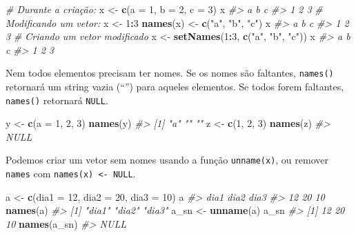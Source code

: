 \documentclass[]{book}
\newenvironment{Shaded}{\begin{snugshade}}{\end{snugshade}}
\newcommand{\KeywordTok}[1]{\textcolor[rgb]{0.13,0.29,0.53}{\textbf{#1}}}
\newcommand{\DataTypeTok}[1]{\textcolor[rgb]{0.13,0.29,0.53}{#1}}
\newcommand{\DecValTok}[1]{\textcolor[rgb]{0.00,0.00,0.81}{#1}}
\newcommand{\StringTok}[1]{\textcolor[rgb]{0.31,0.60,0.02}{#1}}
\newcommand{\CommentTok}[1]{\textcolor[rgb]{0.56,0.35,0.01}{\textit{#1}}}
\newcommand{\OperatorTok}[1]{\textcolor[rgb]{0.81,0.36,0.00}{\textbf{#1}}}
\newcommand{\NormalTok}[1]{#1}
\begin{document}
\begin{Shaded}
\begin{Highlighting}[]
\CommentTok{# Durante a criação:}
\NormalTok{x <-}\StringTok{ }\KeywordTok{c}\NormalTok{(}\DataTypeTok{a =} \DecValTok{1}\NormalTok{, }\DataTypeTok{b =} \DecValTok{2}\NormalTok{, }\DataTypeTok{c =} \DecValTok{3}\NormalTok{)}
\NormalTok{x}
\CommentTok{#> a b c }
\CommentTok{#> 1 2 3}
\CommentTok{# Modificando um vetor:}
\NormalTok{x <-}\StringTok{ }\DecValTok{1}\OperatorTok{:}\DecValTok{3}
\KeywordTok{names}\NormalTok{(x) <-}\StringTok{ }\KeywordTok{c}\NormalTok{(}\StringTok{"a"}\NormalTok{, }\StringTok{"b"}\NormalTok{, }\StringTok{"c"}\NormalTok{)}
\NormalTok{x}
\CommentTok{#> a b c }
\CommentTok{#> 1 2 3}
\CommentTok{# Criando um vetor modificado}
\NormalTok{x <-}\StringTok{ }\KeywordTok{setNames}\NormalTok{(}\DecValTok{1}\OperatorTok{:}\DecValTok{3}\NormalTok{, }\KeywordTok{c}\NormalTok{(}\StringTok{"a"}\NormalTok{, }\StringTok{"b"}\NormalTok{, }\StringTok{"c"}\NormalTok{))}
\NormalTok{x}
\CommentTok{#> a b c }
\CommentTok{#> 1 2 3}
\end{Highlighting}
\end{Shaded}

Nem todos elementos precisam ter nomes. Se os nomes são faltantes,
\texttt{names()} retornará um string vazia (``'') para aqueles
elementos. Se todos forem faltantes, \texttt{names()} retornará
\texttt{NULL}.

\begin{Shaded}
\begin{Highlighting}[]
\NormalTok{y <-}\StringTok{ }\KeywordTok{c}\NormalTok{(}\DataTypeTok{a =} \DecValTok{1}\NormalTok{, }\DecValTok{2}\NormalTok{, }\DecValTok{3}\NormalTok{)}
\KeywordTok{names}\NormalTok{(y)}
\CommentTok{#> [1] "a" ""  ""}
\NormalTok{z <-}\StringTok{ }\KeywordTok{c}\NormalTok{(}\DecValTok{1}\NormalTok{, }\DecValTok{2}\NormalTok{, }\DecValTok{3}\NormalTok{)}
\KeywordTok{names}\NormalTok{(z)}
\CommentTok{#> NULL}
\end{Highlighting}
\end{Shaded}

Podemos criar um vetor sem nomes usando a função \texttt{unname(x)}, ou
remover \texttt{names} com \texttt{names(x)\ \textless{}-\ NULL}.

\begin{Shaded}
\begin{Highlighting}[]
\NormalTok{a <-}\StringTok{ }\KeywordTok{c}\NormalTok{(}\DataTypeTok{dia1 =} \DecValTok{12}\NormalTok{, }\DataTypeTok{dia2 =} \DecValTok{20}\NormalTok{, }\DataTypeTok{dia3 =} \DecValTok{10}\NormalTok{)}
\NormalTok{a}
\CommentTok{#> dia1 dia2 dia3 }
\CommentTok{#>   12   20   10}
\KeywordTok{names}\NormalTok{(a)}
\CommentTok{#> [1] "dia1" "dia2" "dia3"}
\NormalTok{a_sn <-}\StringTok{ }\KeywordTok{unname}\NormalTok{(a)}
\NormalTok{a_sn}
\CommentTok{#> [1] 12 20 10}
\KeywordTok{names}\NormalTok{(a_sn)}
\CommentTok{#> NULL}
\end{Highlighting}
\end{Shaded}
\end{document}
